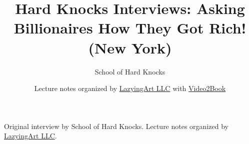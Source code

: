\documentclass[11pt,oneside]{book}
\begin{document}
\frontmatter
\title{Hard Knocks Interviews: Asking Billionaires How They Got Rich! (New York)}
\author{School of Hard Knocks}
\date{Lecture notes organized by \href{https://lazying.art}{LazyingArt LLC} with \href{https://github.com/lachlanchen/Video2Book}{Video2Book}}
\maketitle
\begin{center}
\small Original interview by School of Hard Knocks. Lecture notes organized by \href{https://lazying.art}{LazyingArt LLC}.
\end{center}
\clearpage
\mainmatter

\end{document}
